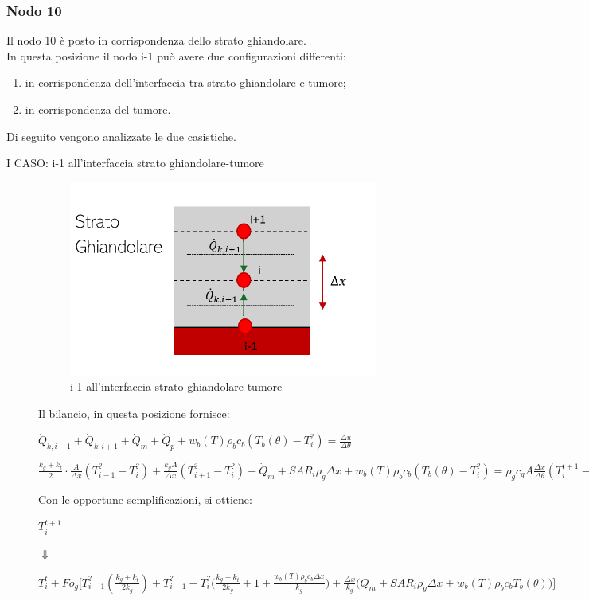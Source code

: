 \subsubsection*{Nodo 10}
Il nodo 10 è posto in corrispondenza dello strato ghiandolare.\\
In questa posizione il nodo i-1 può avere due configurazioni differenti:
\begin{enumerate}
    \item in corrispondenza dell'interfaccia tra strato ghiandolare e tumore;
    \item in corrispondenza del tumore.
\end{enumerate}
Di seguito vengono analizzate le due casistiche.
\begin{description}
    \item[I CASO: i-1 all'interfaccia strato ghiandolare-tumore]
    \begin{figure}[H]
    \centering
    \includegraphics[width=.6\textwidth]{Immagini/Nodi/nodo11.1.png} 
    \caption{i-1 all'interfaccia strato ghiandolare-tumore}
    \label{nodo10.1}
\end{figure}
\noindent
\newline
\noindent
Il bilancio, in questa posizione fornisce:
\begin{center}
	$ \Dot{Q} _{k, i-1} +\Dot{Q} _{k, i+1}+ \Dot{Q} _{m} +\Dot{Q} _{p}+ w_b (T) \rho _b c_b (T_b(\theta)-T_i ^?)= \frac{\Delta u}{\Delta \theta} $
\end{center}
\vspace{0.15cm}
\begin{center}
	$ \frac{k_g+ k_{t}}{2} \cdot\frac{ A }{\Delta x}(T_{i-1} ^? - T_i ^? ) + \frac{k_g A }{\Delta x}(T_{i+1} ^? - T_i ^? )+ \Dot{Q} _{m} + SAR_i\rho _g \Delta x + w_b (T) \rho _b c_b (T_b(\theta)-T_i ^?) = \rho _{g} c_{g} A \frac{\Delta x}{ \Delta \theta}(T_i ^{t+1} - T_i ^t ) $
\end{center}
Con le opportune semplificazioni, si ottiene:
\begin{center}
	$T_i ^{t+1} $
\end{center}
\begin{center}
	$\Downarrow$
\end{center}
\begin{center}
	$T_i ^t + Fo_{g} \Bigg[ T_{i-1} ^? (\frac{k_g+ k_{t}}{2 k_g}) + T_{i+1} ^?- T_i ^? \Big(\frac{k_g+ k_{t}}{2k_g} + 1 + \frac{ w_b (T) \rho _b c_b \Delta x }{k_{g}} \Big) + \frac{\Delta x }{k_{g}} \Big(\Dot{Q} _{m} +  SAR_i \rho _{g} \Delta x + w_b (T) \rho _b c_b T_b(\theta)\Big) \Bigg]$
\end{center}



\end{description}
